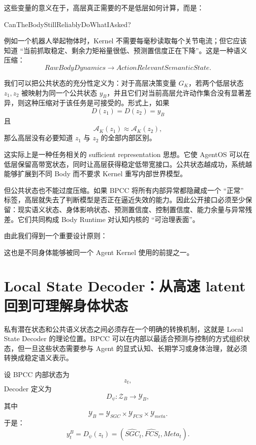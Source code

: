 这些变量的意义在于，高层真正需要的不是低层如何计算，而是：
\begin{statementbox}
CanTheBodyStillReliablyDoWhatIAsked?
\end{statementbox}
例如一个机器人举起物体时，Kernel 不需要每毫秒读取每个关节电流；但它应该知道 ``当前抓取稳定、剩余力矩裕量很低、预测置信度正在下降''。这是一种语义压缩：
\[
RawBodyDynamics
\rightarrow
ActionRelevantSemanticState.
\]

我们可以把公共状态的充分性定义为：对于高层决策变量 $G_K$，若两个低层状态 $z_1,z_2$ 被映射为同一个公共状态 $y_B$，并且它们对当前高层允许动作集合没有显著差异，则这种压缩对于该任务是可接受的。形式上，如果
\[
D(z_1)=D(z_2)=y_B
\]
且
\[
\mathcal A_K(z_1)
\approx
\mathcal A_K(z_2),
\]
那么高层没有必要知道 $z_1$ 与 $z_2$ 的全部内部区别。

这实际上是一种任务相关的 sufficient representation 思想。它使 AgentOS 可以在低层保留高带宽状态，同时让高层获得稳定低带宽接口。公共状态越成功，系统越能够扩展到不同 Body 而不要求 Kernel 重写内部世界模型。

但公共状态也不能过度压缩。如果 BPCC 将所有内部异常都隐藏成一个 ``正常'' 标签，高层就失去了判断模型是否正在逼近失效的能力。因此公开接口必须至少保留：现实语义状态、身体影响状态、预测置信度、控制置信度、能力余量与异常残差。它们共同构成 Body Runtime 对认知内核的 ``可治理表面''。

由此我们得到一个重要设计原则：
\begin{statementbox}
\centering
{}
\end{statementbox}
这也是不同身体能够被同一个 Agent Kernel 使用的前提之一。

\section{Local State Decoder：从高速 latent 回到可理解身体状态}

私有潜在状态和公共语义状态之间必须存在一个明确的转换机制，这就是 Local State Decoder 的理论位置。BPCC 可以在内部以最适合预测与控制的方式组织状态，但一旦这些状态需要参与 Agent 的显式认知、长期学习或身体治理，就必须转换成稳定语义表示。

设 BPCC 内部状态为
\[
z_t,
\]
Decoder 定义为
\[
D_\psi:
\mathcal Z_B
\rightarrow
\mathcal Y_B,
\]
其中
\[
\mathcal Y_B
=
\mathcal Y_{SGC}
\times
\mathcal Y_{FCS}
\times
\mathcal Y_{meta}.
\]
于是：
\[
y_t^B
=
D_\psi(z_t)
=
(
\hat{SGC}_t,
\hat{FCS}_t,
Meta_t
).
\]


